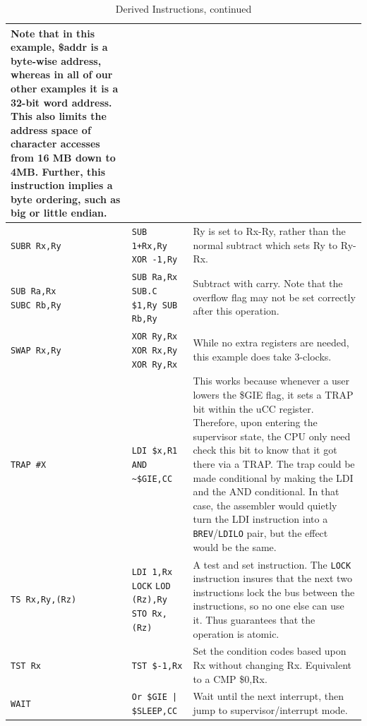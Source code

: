 \documentclass{gqtekspec}
\begin{document}
\begin{table}
\begin{center}
\begin{tabular}{p{1.4in}p{1.5in}p{3in}}
{	Note that in this example, \$addr is a
	byte-wise address, whereas in all of our other examples it is a 
	32-bit word address. This also limits the address space
	of character accesses from 16 MB down to 4MB.
	Further, this instruction implies a byte ordering,
	such as big or little endian.} \\\hline
{\tt SUBR Rx,Ry }
	& \parbox[t]{1.5in}{\tt SUB 1+Rx,Ry\\ XOR -1,Ry} 
	& Ry is set to Rx-Ry, rather than the normal subtract which
	sets Ry to Ry-Rx. \\\hline
\parbox[t]{1.4in}{\tt SUB Ra,Rx\\SUBC Rb,Ry}
	& \parbox[t]{1.5in}{\tt SUB Ra,Rx\\SUB.C \$1,Ry\\SUB Rb,Ry}
	& Subtract with carry.  Note that the overflow flag may not be
	set correctly after this operation.\\\hline
{\tt SWAP Rx,Ry }
	& \parbox[t]{1.5in}{\tt XOR Ry,Rx \\ XOR Rx,Ry \\ XOR Ry,Rx} 
	& While no extra registers are needed, this example
	does take 3-clocks. \\\hline
{\tt TRAP \#X}
	& \parbox[t]{1.5in}{\tt LDI \$x,R1 \\ AND \textasciitilde\$GIE,CC }
	& This works because whenever a user lowers the \$GIE flag, it sets
	a TRAP bit within the uCC register.  Therefore, upon entering the 
	supervisor state, the CPU only need check this bit to know that it
	got there via a TRAP.  The trap could be made conditional by making
	the LDI and the AND conditional.  In that case, the assembler would
	quietly turn the LDI instruction into a {\tt BREV}/{\tt LDILO} pair,
	but the effect would be the same. \\\hline
{\tt TS Rx,Ry,(Rz)}
	& \hbox{\tt LDI 1,Rx}
		\hbox{\tt LOCK}
		\hbox{\tt LOD (Rz),Ry}
		\hbox{\tt STO Rx,(Rz)}
	& A test and set instruction.  The {\tt LOCK} instruction insures
	that the next two instructions lock the bus between the instructions,
	so no one else can use it.  Thus guarantees that the operation is
	atomic.
	\\\hline
{\tt TST Rx}
	& {\tt TST \$-1,Rx}
	& Set the condition codes based upon Rx without changing Rx.
	Equivalent to a CMP \$0,Rx.\\\hline
{\tt WAIT}
	& {\tt Or \$GIE | \$SLEEP,CC}
	& Wait until the next interrupt, then jump to supervisor/interrupt
	mode.
\end{tabular}
\caption{Derived Instructions, continued}\label{tbl:derived-4}
\end{center}\end{table}
\end{document}
